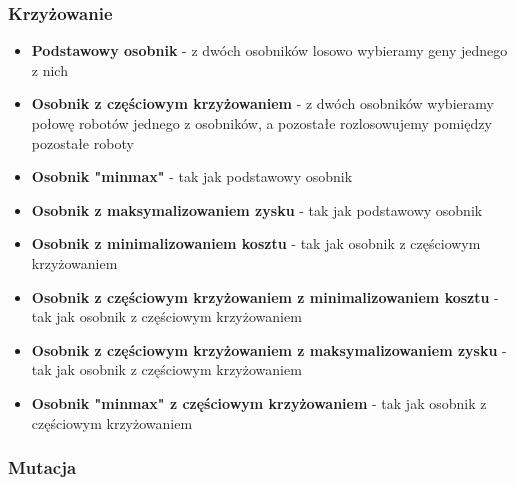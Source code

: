 \documentclass[12pt]{article}
\begin{document}
\subsubsection{Krzyżowanie}
\begin{itemize}
    \item \textbf{Podstawowy osobnik} - z dwóch osobników losowo wybieramy geny jednego z nich
    
    \item \textbf{Osobnik z częściowym krzyżowaniem} - z dwóch osobników wybieramy połowę robotów jednego z osobników, a pozostałe rozlosowujemy pomiędzy pozostałe roboty

    \item \textbf{Osobnik "minmax"} - tak jak podstawowy osobnik
    
    \item \textbf{Osobnik z maksymalizowaniem zysku} - tak jak podstawowy osobnik

    \item \textbf{Osobnik z minimalizowaniem kosztu} - tak jak osobnik z częściowym krzyżowaniem
    
    \item \textbf{Osobnik z częściowym krzyżowaniem z minimalizowaniem kosztu} - tak jak osobnik z częściowym krzyżowaniem
    
    \item \textbf{Osobnik z częściowym krzyżowaniem z maksymalizowaniem zysku} - tak jak osobnik z częściowym krzyżowaniem
    
    \item \textbf{Osobnik "minmax" z częściowym krzyżowaniem} - tak jak osobnik z częściowym krzyżowaniem

\end{itemize}

\subsubsection{Mutacja}
\end{document}
